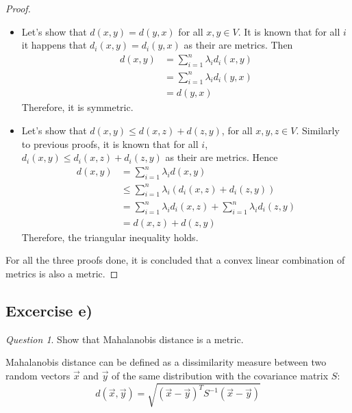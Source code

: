 \documentclass[11pt]{article}
\theoremstyle{definition}
\theoremstyle{remark}
\theoremstyle{remark}
\theoremstyle{remark}
\newtheorem*{question}{Question}
\begin{document}
\begin{proof}
\begin{itemize}
    \item Let's show that $d(x,y) = d(y, x)$ for all $x, y \in V$. It is known
      that for all $i$ it happens that $d_{i}(x,y) = d_{i}(y,x)$ as their are
      metrics. Then
      \begin{align*}
        d(x,y) &= \sum_{i=1}^{n} \lambda_{i}d_{i}(x, y) \\
               &= \sum_{i=1}^{n} \lambda_{i}d_{i}(y, x) \\
               &= d(y, x)
      \end{align*}
      Therefore, it is symmetric.

    \item Let's show that $d(x,y) \le d(x, z) + d(z, y)$, for all
      $x, y, z \in V$. Similarly to previous proofs, it is known that for all
      $i$, $d_{i}(x,y) \le d_{i}(x,z) + d_{i}(z, y)$ as their are metrics. Hence
      \begin{align*}
        d(x,y) &= \sum_{i=1}^{n}\lambda_{i}d(x,y) \\
               &\le \sum_{i=1}^{n}\lambda_{i}\left(d_{i}(x,z) + d_{i}(z, y)\right) \\
               &= \sum_{i=1}^{n} \lambda_{i}d_{i}(x,z) + \sum_{i=1}^{n}\lambda_{i}d_{i}(z,y) \\
               &= d(x, z) + d(z, y)
      \end{align*}
      Therefore, the triangular inequality holds.
  \end{itemize}

  For all the three proofs done, it is concluded that a convex linear
  combination of metrics is also a metric.
\end{proof}

\subsection*{Excercise e)}

\begin{question}
  Show that Mahalanobis distance is a metric.
\end{question}

Mahalanobis distance can be defined as a dissimilarity measure between two
random vectors $\vec{x}$ and $\vec{y}$ of the same distribution with the
covariance matrix $S$:
\[
  d(\vec{x},\vec{y}) = \sqrt{(\vec{x} - \vec{y})^{T}S^{-1}(\vec{x}-\vec{y})}
\]
\end{document}
